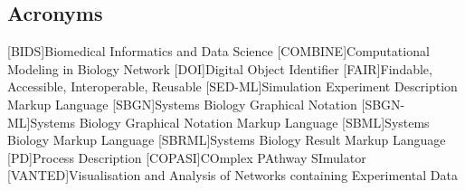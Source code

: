 \subsection*{Acronyms}
    \begin{acronym}[acrmeta]
        [BIDS]{Biomedical Informatics and Data Science}
        [COMBINE]{Computational Modeling in Biology Network}
        [DOI]{Digital Object Identifier}
        [FAIR]{Findable, Accessible, Interoperable, Reusable}
        [SED-ML]{Simulation Experiment Description Markup Language}
        [SBGN]{Systems Biology Graphical Notation}
        [SBGN-ML]{Systems Biology Graphical Notation Markup Language}
        [SBML]{Systems Biology Markup Language}
        [SBRML]{Systems Biology Result Markup Language}
        [PD]{Process Description}
        [COPASI]{COmplex PAthway SImulator}
        [VANTED]{Visualisation and Analysis of Networks containing Experimental Data}
    \end{acronym}